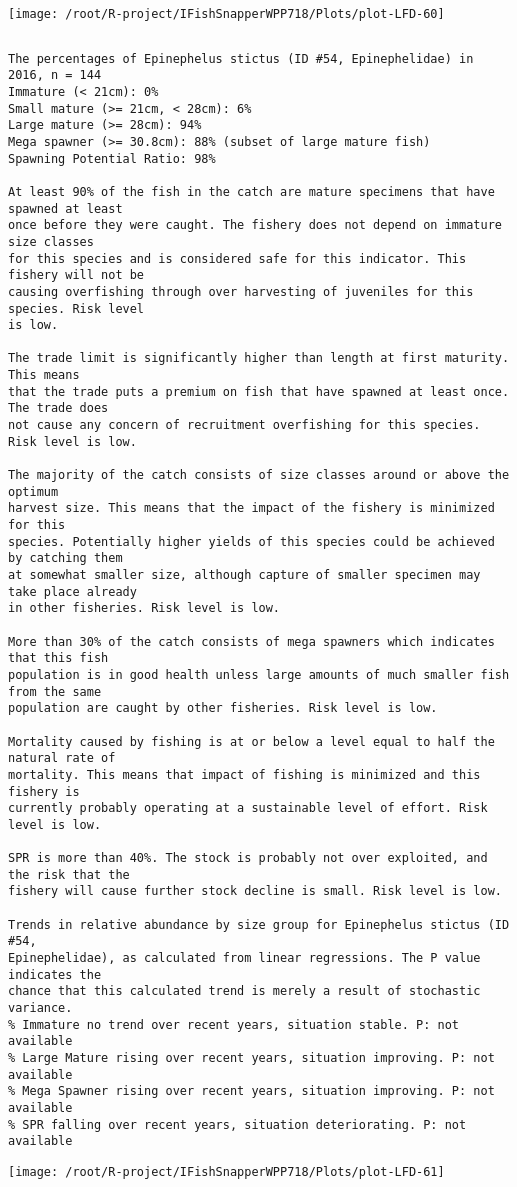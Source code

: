 \documentclass{report}\usepackage[]{graphicx}\usepackage[]{color}
\makeatletter
\def\maxwidth{ %
  \ifdim\Gin@nat@width>\linewidth
    \linewidth
  \else
    \Gin@nat@width
  \fi
}
\newenvironment{kframe}{%
 \def\at@end@of@kframe{}%
 \ifinner\ifhmode%
  \def\at@end@of@kframe{\end{minipage}}%
  \begin{minipage}{\columnwidth}%
 \fi\fi%
 \def\FrameCommand##1{\hskip\@totalleftmargin \hskip-\fboxsep
 \colorbox{shadecolor}{##1}\hskip-\fboxsep
     \hskip-\linewidth \hskip-\@totalleftmargin \hskip\columnwidth}%
 \MakeFramed {\advance\hsize-\width
   \@totalleftmargin\z@ \linewidth\hsize
   \@setminipage}}%
 {\par\unskip\endMakeFramed%
 \at@end@of@kframe}
\newenvironment{knitrout}{}{} %
\makeatother
\begin{document}
\begin{knitrout}
\texttt{[image: /root/R-project/IFishSnapperWPP718/Plots/plot-LFD-60]} 
\begin{kframe}\begin{verbatim}
\end{verbatim}
\end{kframe}
\clearpage
\newpage
\begin{kframe}\begin{verbatim}The percentages of Epinephelus stictus (ID #54, Epinephelidae) in 2016, n = 144
Immature (< 21cm): 0%
Small mature (>= 21cm, < 28cm): 6%
Large mature (>= 28cm): 94%
Mega spawner (>= 30.8cm): 88% (subset of large mature fish)
Spawning Potential Ratio: 98%
 
At least 90% of the fish in the catch are mature specimens that have spawned at least
once before they were caught. The fishery does not depend on immature size classes
for this species and is considered safe for this indicator. This fishery will not be
causing overfishing through over harvesting of juveniles for this species. Risk level
is low.

The trade limit is significantly higher than length at first maturity.  This means
that the trade puts a premium on fish that have spawned at least once. The trade does
not cause any concern of recruitment overfishing for this species. Risk level is low.

The majority of the catch consists of size classes around or above the optimum
harvest size. This means that the impact of the fishery is minimized for this
species. Potentially higher yields of this species could be achieved by catching them
at somewhat smaller size, although capture of smaller specimen may take place already
in other fisheries. Risk level is low.

More than 30% of the catch consists of mega spawners which indicates that this fish
population is in good health unless large amounts of much smaller fish from the same
population are caught by other fisheries. Risk level is low.
 
Mortality caused by fishing is at or below a level equal to half the natural rate of
mortality. This means that impact of fishing is minimized and this fishery is
currently probably operating at a sustainable level of effort. Risk level is low.
 
SPR is more than 40%. The stock is probably not over exploited, and the risk that the
fishery will cause further stock decline is small. Risk level is low.
 
Trends in relative abundance by size group for Epinephelus stictus (ID #54,
Epinephelidae), as calculated from linear regressions. The P value indicates the
chance that this calculated trend is merely a result of stochastic variance.
% Immature no trend over recent years, situation stable. P: not available
% Large Mature rising over recent years, situation improving. P: not available
% Mega Spawner rising over recent years, situation improving. P: not available
% SPR falling over recent years, situation deteriorating. P: not available
\end{verbatim}
\end{kframe}
\texttt{[image: /root/R-project/IFishSnapperWPP718/Plots/plot-LFD-61]} 


\end{knitrout}
\end{document}

